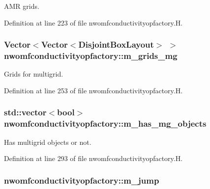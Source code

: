A\+MR grids. 



Definition at line 223 of file nwomfconductivityopfactory.\+H.

\subsubsection[{\texorpdfstring{m\+\_\+grids\+\_\+mg}{m_grids_mg}}]{\setlength{\rightskip}{0pt plus 5cm}Vector$<$Vector$<$Disjoint\+Box\+Layout$>$ $>$ nwomfconductivityopfactory\+::m\+\_\+grids\+\_\+mg\hspace{0.3cm}{\ttfamily [protected]}}\hypertarget{classnwomfconductivityopfactory_a823ba114bca6a6b83dbd38781ecf45ee}{}\label{classnwomfconductivityopfactory_a823ba114bca6a6b83dbd38781ecf45ee}


Grids for multigrid. 



Definition at line 253 of file nwomfconductivityopfactory.\+H.

\subsubsection[{\texorpdfstring{m\+\_\+has\+\_\+mg\+\_\+objects}{m_has_mg_objects}}]{\setlength{\rightskip}{0pt plus 5cm}std\+::vector$<$bool$>$ nwomfconductivityopfactory\+::m\+\_\+has\+\_\+mg\+\_\+objects\hspace{0.3cm}{\ttfamily [protected]}}\hypertarget{classnwomfconductivityopfactory_af6e7be6ddca5cf1d6ce2a8ee16223d7e}{}\label{classnwomfconductivityopfactory_af6e7be6ddca5cf1d6ce2a8ee16223d7e}


Has multigrid objects or not. 



Definition at line 293 of file nwomfconductivityopfactory.\+H.

\subsubsection[{\texorpdfstring{m\+\_\+jump}{m_jump}}]{ nwomfconductivityopfactory\+::m\+\_\+jump\hspace{0.3cm}{\ttfamily [protected]}}\hypertarget{classnwomfconductivityopfactory_ab93c6115032e5884948220ed7fe2f7c7}{}\label{classnwomfconductivityopfactory_ab93c6115032e5884948220ed7fe2f7c7}


